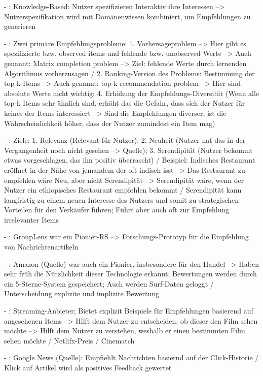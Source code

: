 - \cite[S. 2]{recommenderSystems:2016}: Knowledge-Based: Nutzer spezifizieren Interaktiv ihre Interessen --> Nutzerspezifikation wird mit Domänenwissen kombiniert, um Empfehlungen zu generieren

- \cite[S. 3]{recommenderSystems:2016}: Zwei primäre Empfehlungsprobleme: 1. Vorhersageproblem --> Hier gibt es spezifizierte bzw. observed items und fehlende bzw. unobserved Werte --> Auch genannt: Matrix completion problem --> Ziel: fehlende Werte durch lernenden Algorithmus vorherzusagen / 2. Ranking-Version des Problems: Bestimmung der top k-Items --> Auch genannt: top-k recommendation problem --> Hier sind absolute Werte nicht wichtig; 4. Erhöhung der Empfehlungs-Diversität (Wenn alle top-k Items sehr ähnlich sind, erhöht das die Gefahr, dass sich der Nutzer für keines der Items interessiert --> Sind die Empfehlungen diverser, ist die Wahrscheinlichkeit höher, dass der Nutzer zumindest ein Item mag)

- \cite[S. 4]{recommenderSystems:2016}: Ziele: 1. Relevanz (Relevant für Nutzer); 2. Neuheit (Nutzer hat das in der Vergangenheit noch nicht gesehen --> Quelle); 3. Serendipität (Nutzer bekommt etwas vorgeschlagen, das ihn positiv überrascht) / Beispiel: Indisches Restaurant eröffnet in der Nähe von jemandem der oft indisch isst --> Das Restaurant zu empfehlen wäre Neu, aber nicht Serendipität --> Serendipität wäre, wenn der Nutzer ein ethiopisches Restaurant empfohlen bekommt / Serendipität kann langfristig zu einem neuen Interesse des Nutzers und somit zu strategischen Vorteilen für den Verkäufer führen; Führt aber auch oft zur Empfehlung irrelevanter Items

- \cite[S. 5]{recommenderSystems:2016}: GroupLens war ein Pionier-RS --> Forschungs-Prototyp für die Empfehlung von Nachrichtenartikeln

- \cite[S. 5]{recommenderSystems:2016}: Amazon (Quelle) war auch ein Pionier, insbesondere für den Handel --> Haben sehr früh die Nützlichkeit dieser Technologie erkannt; Bewertungen werden durch ein 5-Sterne-System gespeichert; Auch werden Surf-Daten geloggt / Unterscheidung explizite und implizite Bewertung 

- \cite[S. 5f.]{recommenderSystems:2016}: Streaming-Anbieter; Bietet explizit Beispiele für Empfehlungen basierend auf angesehenen Items --> Hilft dem Nutzer zu entscheiden, ob dieser den Film sehen möchte --> Hilft dem Nutzer zu verstehen, weshalb er einen bestimmten Film sehen möchte / Netlifx-Preis / Cinematch

- \cite[S. 6]{recommenderSystems:2016}: Google News (Quelle): Empfiehlt Nachrichten basiernd auf der Click-Historie / Klick auf Artikel wird als positives Feedback gewertet 

